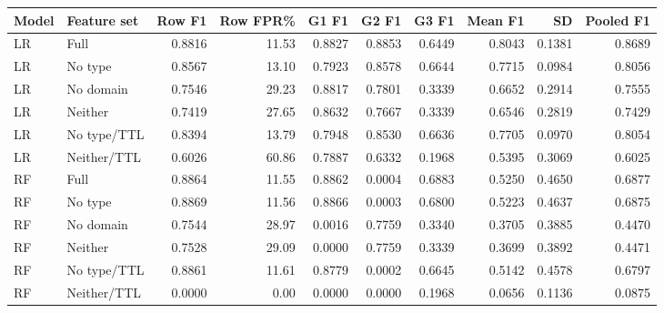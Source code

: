 \centering\footnotesize
\begin{tabular}{@{}llrrrrrrrr@{}}
\toprule
Model & Feature set & Row F1 & Row FPR\% & G1 F1 & G2 F1 & G3 F1 & Mean F1 & SD & Pooled F1\\\midrule
LR & Full & 0.8816 & 11.53 & 0.8827 & 0.8853 & 0.6449 & 0.8043 & 0.1381 & 0.8689\\
LR & No type & 0.8567 & 13.10 & 0.7923 & 0.8578 & 0.6644 & 0.7715 & 0.0984 & 0.8056\\
LR & No domain & 0.7546 & 29.23 & 0.8817 & 0.7801 & 0.3339 & 0.6652 & 0.2914 & 0.7555\\
LR & Neither & 0.7419 & 27.65 & 0.8632 & 0.7667 & 0.3339 & 0.6546 & 0.2819 & 0.7429\\
LR & No type/TTL & 0.8394 & 13.79 & 0.7948 & 0.8530 & 0.6636 & 0.7705 & 0.0970 & 0.8054\\
LR & Neither/TTL & 0.6026 & 60.86 & 0.7887 & 0.6332 & 0.1968 & 0.5395 & 0.3069 & 0.6025\\
RF & Full & 0.8864 & 11.55 & 0.8862 & 0.0004 & 0.6883 & 0.5250 & 0.4650 & 0.6877\\
RF & No type & 0.8869 & 11.56 & 0.8866 & 0.0003 & 0.6800 & 0.5223 & 0.4637 & 0.6875\\
RF & No domain & 0.7544 & 28.97 & 0.0016 & 0.7759 & 0.3340 & 0.3705 & 0.3885 & 0.4470\\
RF & Neither & 0.7528 & 29.09 & 0.0000 & 0.7759 & 0.3339 & 0.3699 & 0.3892 & 0.4471\\
RF & No type/TTL & 0.8861 & 11.61 & 0.8779 & 0.0002 & 0.6645 & 0.5142 & 0.4578 & 0.6797\\
RF & Neither/TTL & 0.0000 & 0.00 & 0.0000 & 0.0000 & 0.1968 & 0.0656 & 0.1136 & 0.0875\\
\bottomrule
\end{tabular}
